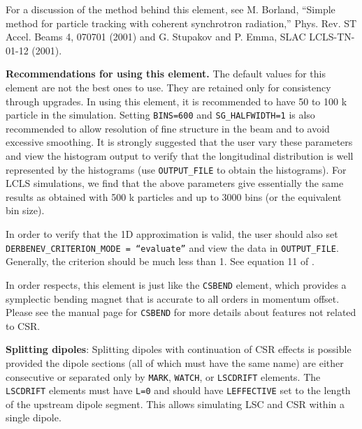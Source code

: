 For a discussion of the method behind this element, see M. Borland,
``Simple method for particle tracking with coherent synchrotron
radiation,'' Phys. Rev. ST Accel. Beams 4, 070701 (2001) and
G. Stupakov and P. Emma, SLAC LCLS-TN-01-12 (2001).

{\bf Recommendations for using this element.}  The default values for
this element are not the best ones to use.  They are retained only for
consistency through upgrades.  In using this element, it is
recommended to have 50 to 100 k particle in the simulation.  Setting
{\tt BINS=600} and {\tt SG\_HALFWIDTH=1} is also recommended to allow
resolution of fine structure in the beam and to avoid excessive
smoothing.  It is strongly suggested that the user vary these
parameters and view the histogram output to verify that the
longitudinal distribution is well represented by the histograms (use
{\tt OUTPUT\_FILE} to obtain the histograms).  For LCLS simulations,
we find that the above parameters give essentially the same results as
obtained with 500 k particles and up to 3000 bins (or the equivalent
bin size).

In order to verify that the 1D approximation is valid, the user should
also set {\tt DERBENEV\_CRITERION\_MODE = ``evaluate''} and view
the data in {\tt OUTPUT\_FILE}.  Generally, the criterion should be
much less than 1.  See equation 11 of \cite{Derbenev}.

In order respects, this element is just like the {\tt CSBEND} element,
which provides a symplectic bending magnet that is accurate to all
orders in momentum offset. Please see the manual page for {\tt CSBEND}
for more details about features not related to CSR.

{\bf Splitting dipoles}: 
Splitting dipoles with continuation of CSR effects is possible provided the dipole sections (all of which must have the
same name) are either consecutive or separated only by \verb|MARK|, \verb|WATCH|, or \verb|LSCDRIFT| elements.
The \verb|LSCDRIFT| elements must have \verb|L=0| and should have \verb|LEFFECTIVE| set to the length of the upstream
dipole segment.
This allows simulating LSC and CSR within a single dipole.



